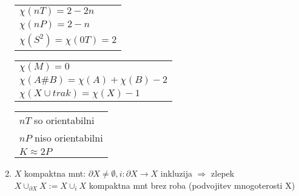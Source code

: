\documentclass[10pt,a4paper]{article}
\begin{document}
\begin{enumerate}
\begin{tabular}{l}
    \end{tabular}
    \begin{tabular}{|l|}
        \hline
        $\chi(nT) = 2 - 2n$ \\
        $\chi(nP) = 2 - n$ \\
        $\chi(S^2) = \chi(0T) = 2$ \\
        \hline
    \end{tabular}
    \begin{tabular}{|l|}
        \hline
        $\chi(M) = 0$ \\
        $\chi(A \# B) = \chi(A) + \chi(B) - 2$ \\
        $\chi(X \cup trak) = \chi(X) - 1$ \\
        \hline
    \end{tabular}
    \begin{tabular}{l}
        $nT$ so orientabilni \\
        $nP$ niso orientabilni \\
        $K \approx 2P$
    \end{tabular}

\item $X$ kompaktna mnt: $\partial X \neq \emptyset, i: \partial X \rightarrow X$ inkluzija $\Rightarrow$ zlepek $X \cup_{\partial X} X := X \cup _i X$ kompaktna mnt brez roba (podvojitev mnogoterosti X)



\end{enumerate}
\end{document}
